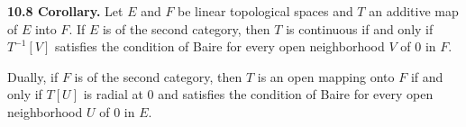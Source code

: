 \textbf{10.8 Corollary.} Let $E$ and $F$ be linear topological spaces and $T$ an additive map of $E$ into $F$. If $E$ is of the second category, then $T$ is continuous if and only if $T^{-1}[V]$ satisfies the condition of Baire for every open neighborhood $V$ of $0$ in $F$.

Dually, if $F$ is of the second category, then $T$ is an open mapping onto $F$ if and only if $T[U]$ is radial at $0$ and satisfies the condition of Baire for every open neighborhood $U$ of $0$ in $E$.
